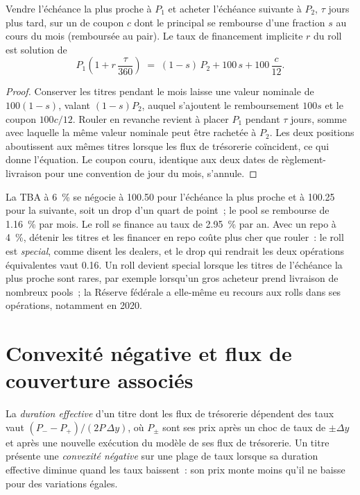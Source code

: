 \begin{proposition}\label{prop:m2:mortgages-and-agencies:roll}
Vendre l'échéance la plus proche à $P_1$ et acheter l'échéance suivante à $P_2$, $\tau$ jours
plus tard, sur un  de coupon $c$ dont le principal se rembourse d'une fraction
$s$ au cours du mois (remboursée au pair). Le taux de financement implicite $r$ du roll
est solution de
\[
P_1\left(1 + r\,\frac{\tau}{360}\right) \;=\; (1-s)\,P_2 + 100\,s + 100\,\frac{c}{12}.
\]
\end{proposition}

\begin{proof}
Conserver les titres pendant le mois laisse une valeur nominale de $100(1-s)$, valant
$(1-s)P_2$, auquel s'ajoutent le remboursement $100s$ et le coupon $100c/12$. Rouler
en revanche revient à placer $P_1$ pendant $\tau$ jours, somme avec laquelle la même valeur nominale peut être
rachetée à $P_2$. Les deux positions aboutissent aux mêmes titres lorsque les
flux de trésorerie coïncident, ce qui donne l'équation. Le coupon couru, identique aux deux
dates de règlement-livraison pour une convention de jour du mois, s'annule.
\end{proof}

\begin{example}[Un roll]\label{ex:m2:mortgages-and-agencies:roll}
La TBA à 6~\% se négocie à 100.50 pour l'échéance la plus proche et à 100.25 pour la suivante, soit un
drop d'un quart de point~; le pool se rembourse de 1.16~\% par mois. Le roll se finance au
taux de 2.95~\% par an. Avec un repo à 4~\%, détenir les titres et les financer en
repo coûte plus cher que rouler~: le roll est \emph{special}, comme disent les dealers,
et le drop qui rendrait les deux opérations équivalentes vaut 0.16. Un roll devient
special lorsque les titres de l'échéance la plus proche sont rares, par exemple lorsqu'un gros acheteur
prend livraison de nombreux pools~; la Réserve fédérale a elle-même eu recours aux rolls
dans ses opérations, notamment en 2020.
\end{example}

\section{Convexité négative et flux de couverture associés}

\begin{definition}\label{def:m2:mortgages-and-agencies:convexity}
La \emph{duration effective} d'un titre dont les
flux de trésorerie dépendent des taux vaut $(P_- - P_+)/(2P\,\Delta y)$, où $P_\pm$ sont
ses prix après un choc de taux de $\pm\Delta y$ et après une nouvelle exécution du modèle de
ses flux de trésorerie. Un titre présente une \emph{convexité négative}
sur une plage de taux lorsque sa duration effective diminue quand les taux
baissent~: son prix monte moins qu'il ne baisse pour des variations égales.
\end{definition}

